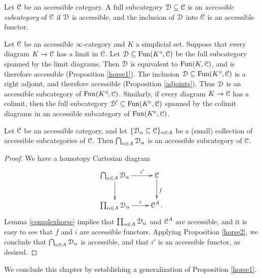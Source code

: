 \begin{definition}\label{defaccsub}
Let $\operatorname{\mathcal{C}}$ be an accessible category. A full subcategory $\operatorname{\mathcal{D}} \subseteq \operatorname{\mathcal{C}}$ is
an {\it accessible subcategory} of $\operatorname{\mathcal{C}}$ if $\operatorname{\mathcal{D}}$ is accessible, and the inclusion
of $\operatorname{\mathcal{D}}$ into $\operatorname{\mathcal{C}}$ is an accessible functor.
\end{definition}

\begin{example}\label{colexam}
Let $\operatorname{\mathcal{C}}$ be an accessible $\infty$-category and $K$ a simplicial set. Suppose that
every diagram $K \rightarrow \operatorname{\mathcal{C}}$ has a limit in $\operatorname{\mathcal{C}}$. Let
$\operatorname{\mathcal{D}} \subseteq \operatorname{Fun}(K^{\triangleleft}, \operatorname{\mathcal{C}}) $ be the full subcategory spanned by the
limit diagrams. Then $\operatorname{\mathcal{D}}$ is equivalent to $\operatorname{Fun}(K,\operatorname{\mathcal{C}})$, and is therefore accessible (Proposition \ref{horse1}). The inclusion $\operatorname{\mathcal{D}} \subseteq \operatorname{Fun}(K^{\triangleleft}, \operatorname{\mathcal{C}})$ is a right adjoint, and therefore accessible (Proposition \ref{adjoints}). Thus $\operatorname{\mathcal{D}}$ is an accessible subcategory of
$\operatorname{Fun}(K^{\triangleleft}, \operatorname{\mathcal{C}})$. 
Similarly, if every diagram $K \rightarrow \operatorname{\mathcal{C}}$
has a colimit, then the full subcategory $\operatorname{\mathcal{D}}' \subseteq 
\operatorname{Fun}(K^{\triangleright}, \operatorname{\mathcal{C}})$ spanned by the colimit diagrams in an accessible subcategory of $\operatorname{Fun}(K^{\triangleright}, \operatorname{\mathcal{C}})$. 
\end{example}

\begin{proposition}\label{boundint}
Let $\operatorname{\mathcal{C}}$ be an accessible category, and let $\{ \operatorname{\mathcal{D}}_{\alpha} \subseteq \operatorname{\mathcal{C}} \}_{\alpha \in A}$
be a (small) collection of accessible subcategories of $\operatorname{\mathcal{C}}$. Then
$\bigcap_{\alpha \in A} \operatorname{\mathcal{D}}_{\alpha}$ is an accessible subcategory of $\operatorname{\mathcal{C}}$.
\end{proposition}

\begin{proof}
We have a homotopy Cartesian diagram
$$ \xymatrix{ \bigcap_{\alpha \in A} \calD_{\alpha} \ar[r]^-{i'} \ar[d] & \calC \ar[d]^{f} \\
\prod_{\alpha \in A} \calD_{\alpha} \ar[r]^-{i} & \calC^{A}. }$$
Lemma \ref{complexhorse} implies that $\prod_{\alpha \in A} \operatorname{\mathcal{D}}_{\alpha}$ and
$\operatorname{\mathcal{C}}^{A}$ are accessible, and it is easy to see that $f$ and $i$ are accessible functors. Applying Proposition \ref{horse2}, we conclude that $\bigcap_{\alpha \in A} \operatorname{\mathcal{D}}_{\alpha}$ is accessible, and that $i'$ is an accessible functor, as desired.
\end{proof}

We conclude this chapter by establishing a generalization of Proposition \ref{horse1}.

